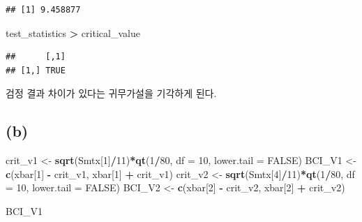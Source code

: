 \documentclass[
]{article}
\newenvironment{Shaded}{\begin{snugshade}}{\end{snugshade}}
\newcommand{\AttributeTok}[1]{\textcolor[rgb]{0.13,0.29,0.53}{#1}}
\newcommand{\ConstantTok}[1]{\textcolor[rgb]{0.56,0.35,0.01}{#1}}
\newcommand{\DecValTok}[1]{\textcolor[rgb]{0.00,0.00,0.81}{#1}}
\newcommand{\FunctionTok}[1]{\textcolor[rgb]{0.13,0.29,0.53}{\textbf{#1}}}
\newcommand{\NormalTok}[1]{#1}
\newcommand{\OtherTok}[1]{\textcolor[rgb]{0.56,0.35,0.01}{#1}}
\newcommand{\SpecialCharTok}[1]{\textcolor[rgb]{0.81,0.36,0.00}{\textbf{#1}}}
\begin{document}
\begin{verbatim}
## [1] 9.458877
\end{verbatim}

\begin{Shaded}
\begin{Highlighting}[]
\NormalTok{test\_statistics }\SpecialCharTok{\textgreater{}}\NormalTok{ critical\_value}
\end{Highlighting}
\end{Shaded}

\begin{verbatim}
##      [,1]
## [1,] TRUE
\end{verbatim}

검정 결과 차이가 있다는 귀무가설을 기각하게 된다.

\subsection{(b)}\label{b}

\begin{Shaded}
\begin{Highlighting}[]
\NormalTok{crit\_v1 }\OtherTok{\textless{}{-}} \FunctionTok{sqrt}\NormalTok{(Smtx[}\DecValTok{1}\NormalTok{]}\SpecialCharTok{/}\DecValTok{11}\NormalTok{)}\SpecialCharTok{*}\FunctionTok{qt}\NormalTok{(}\DecValTok{1}\SpecialCharTok{/}\DecValTok{80}\NormalTok{, }\AttributeTok{df =} \DecValTok{10}\NormalTok{, }\AttributeTok{lower.tail =} \ConstantTok{FALSE}\NormalTok{)}
\NormalTok{BCI\_V1 }\OtherTok{\textless{}{-}} \FunctionTok{c}\NormalTok{(xbar[}\DecValTok{1}\NormalTok{] }\SpecialCharTok{{-}}\NormalTok{ crit\_v1, xbar[}\DecValTok{1}\NormalTok{] }\SpecialCharTok{+}\NormalTok{ crit\_v1)}
\NormalTok{crit\_v2 }\OtherTok{\textless{}{-}} \FunctionTok{sqrt}\NormalTok{(Smtx[}\DecValTok{4}\NormalTok{]}\SpecialCharTok{/}\DecValTok{11}\NormalTok{)}\SpecialCharTok{*}\FunctionTok{qt}\NormalTok{(}\DecValTok{1}\SpecialCharTok{/}\DecValTok{80}\NormalTok{, }\AttributeTok{df =} \DecValTok{10}\NormalTok{, }\AttributeTok{lower.tail =} \ConstantTok{FALSE}\NormalTok{)}
\NormalTok{BCI\_V2 }\OtherTok{\textless{}{-}} \FunctionTok{c}\NormalTok{(xbar[}\DecValTok{2}\NormalTok{] }\SpecialCharTok{{-}}\NormalTok{ crit\_v2, xbar[}\DecValTok{2}\NormalTok{] }\SpecialCharTok{+}\NormalTok{ crit\_v2)}
\end{Highlighting}
\end{Shaded}

\begin{Shaded}
\begin{Highlighting}[]
\NormalTok{BCI\_V1}
\end{Highlighting}
\end{Shaded}
\end{document}
